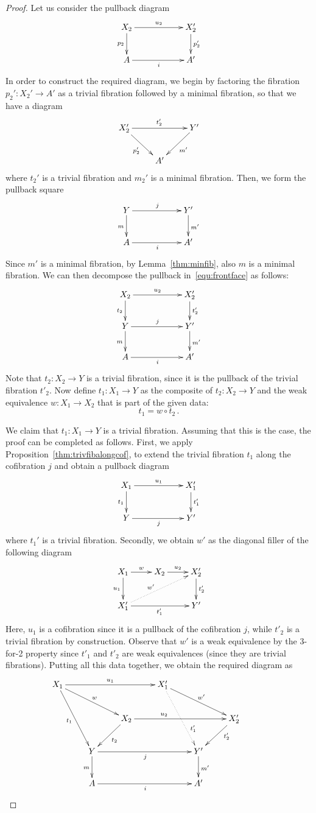 \documentclass[reqno,10pt,a4paper,oneside]{amsart}
\theoremstyle{definition}
\newcommand{\co}{\colon}
\begin{document}
\begin{proof} Let us consider the pullback diagram
\begin{equation}
\label{equ:frontface}
{\vcenter{\hbox{\xymatrix@C=2cm{
X_2 \ar[r]^{u_2} \ar[d]_{p_2} & X'_2 \ar[d]^{p'_2} \\
A \ar[r]_{i} & A'}}}}
\end{equation}
 In order to construct the required diagram, we begin by 
 factoring the fibration $p_2' \co X_2' \to A'$ as  a trivial fibration followed by a minimal fibration, so that we have
a diagram
\[
\xymatrix{
X_2' \ar[rr]^{t_2'} \ar[dr]_{p_2'} & & Y' \ar[dl]^{m'} \\
 & A' & }
 \]
 where $t_2'$ is a trivial fibration and $m_2'$ is a minimal fibration. Then, we form the pullback square
 \[
 \xymatrix@C=2cm{
 Y \ar[r]^j \ar[d]_{m} & Y'  \ar[d]^{m'} \\
  A \ar[r]_{i} & A'}
 \]
Since $m'$ is a minimal fibration, by Lemma~\ref{thm:minfib}, also $m$ is a minimal fibration. We can then decompose the pullback  in~\eqref{equ:frontface} as follows:
 \[
 \xymatrix@C=2cm@R=0.8cm{
 X_2 \ar[r]^{u_2} \ar[d]_{t_2} & X'_2 \ar[d]^{t'_2} \\
  Y \ar[r]^{j} \ar[d]_{m} & Y' \ar[d]^{m'} \\ 
  A \ar[r]_{i} & A'}
 \]
Note that $t_2 \co X_2 \to Y$ is a trivial fibration, since it is the pullback of the trivial fibration $t'_2$. Now define
$t_1 \co X_1 \to Y$ as the composite of $t_2 \co X_2 \to Y$ and the weak equivalence $w \co X_1 \to X_2$  
that is part of the given data:
\[
t_1 = w \circ t_2 \, .
\]

 \medskip

We claim that $t_1 \co X_1 \to Y$ is a trivial fibration. 
Assuming that this is the case, the proof can be completed as follows. First, we apply Proposition~\ref{thm:trivfibalongcof}, to extend the trivial fibration $t_1$ along the cofibration $j$ and obtain a pullback diagram
\[
\xymatrix@C=2cm{
X_1 \ar[r]^{u_1} \ar[d]_{t_1} & X_1' \ar[d]^{t'_1} \\
Y \ar[r]_j & Y'}
\]
where $t_1'$ is a trivial fibration. Secondly, we obtain $w'$ as the diagonal filler of the following diagram
\[
\xymatrix{
X_1 \ar[r]^{w} \ar[d]_{u_1} & X_2 \ar[r]^{u_2} & X_2' \ar[d]^{t'_2} \\ 
X'_1 \ar[rr]_{t'_1} \ar@{.>}[urr]^(.42){w'} & & Y'} 
 \]
 Here, $u_1$ is a cofibration since it is a pullback of the cofibration  $j$, while $t'_2$ is a trivial fibration by
 construction. Observe that $w'$ is a weak equivalence by the 3-for-2 property since $t'_1$ and $t'_2$ are
 weak equivalences (since they are trivial fibrations). Putting all this data together, we obtain the required
 diagram as
 \[
 \xymatrix{
 X_1 \ar[ddr]_{t_1}  \ar[drr]^{w} \ar[rrr]^{u_1} &  & & X_1' \ar[drr]^{w'}  \ar@{.>}[ddr]^(.7){t_1'}  & & \\
  & & X_2 \ar[dl]^{t_2} \ar[rrr]^(.35){u_2} & & &  X_2' \ar[dl]^(.35){t'_2} \\
  & Y \ar[rrr]_j  \ar[d]_m  & & & Y' \ar[d]^{m'} & & \\
  & A \ar[rrr]_{i}  & & &A' & & }
  \]
  

\end{proof}
\end{document}
